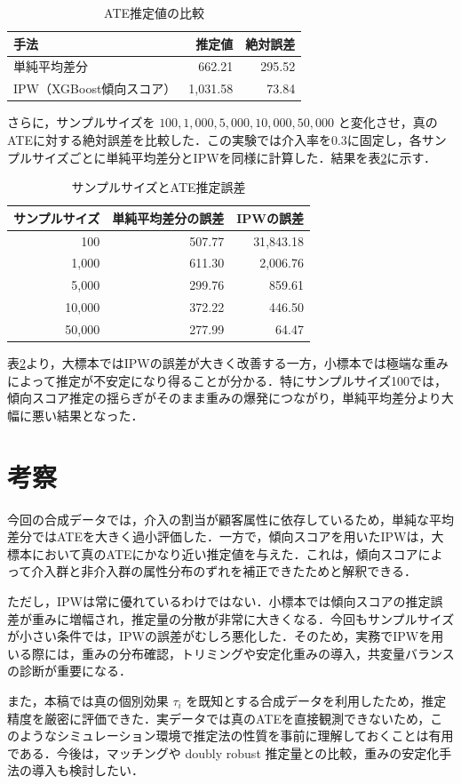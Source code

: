 \documentclass{article}
\begin{document}
\begin{table}[ht]
\centering
\caption{ATE推定値の比較}
\label{tab:ate_compare}
\begin{tabular}{lrr}
\hline
手法 & 推定値 & 絶対誤差 \\
\hline
単純平均差分 & 662.21 & 295.52 \\
IPW（XGBoost傾向スコア） & 1{,}031.58 & 73.84 \\
\hline
\end{tabular}
\end{table}

さらに，サンプルサイズを $100, 1{,}000, 5{,}000, 10{,}000, 50{,}000$ と変化させ，真のATEに対する絶対誤差を比較した．この実験では介入率を0.3に固定し，各サンプルサイズごとに単純平均差分とIPWを同様に計算した．結果を表\ref{tab:samplesize}に示す．

\begin{table}[ht]
\centering
\caption{サンプルサイズとATE推定誤差}
\label{tab:samplesize}
\begin{tabular}{rrr}
\hline
サンプルサイズ & 単純平均差分の誤差 & IPWの誤差 \\
\hline
100 & 507.77 & 31{,}843.18 \\
1{,}000 & 611.30 & 2{,}006.76 \\
5{,}000 & 299.76 & 859.61 \\
10{,}000 & 372.22 & 446.50 \\
50{,}000 & 277.99 & 64.47 \\
\hline
\end{tabular}
\end{table}

表\ref{tab:samplesize}より，大標本ではIPWの誤差が大きく改善する一方，小標本では極端な重みによって推定が不安定になり得ることが分かる．特にサンプルサイズ100では，傾向スコア推定の揺らぎがそのまま重みの爆発につながり，単純平均差分より大幅に悪い結果となった．

\section{考察}
今回の合成データでは，介入の割当が顧客属性に依存しているため，単純な平均差分ではATEを大きく過小評価した．一方で，傾向スコアを用いたIPWは，大標本において真のATEにかなり近い推定値を与えた．これは，傾向スコアによって介入群と非介入群の属性分布のずれを補正できたためと解釈できる．

ただし，IPWは常に優れているわけではない．小標本では傾向スコアの推定誤差が重みに増幅され，推定量の分散が非常に大きくなる．今回もサンプルサイズが小さい条件では，IPWの誤差がむしろ悪化した．そのため，実務でIPWを用いる際には，重みの分布確認，トリミングや安定化重みの導入，共変量バランスの診断が重要になる．

また，本稿では真の個別効果 $\tau_i$ を既知とする合成データを利用したため，推定精度を厳密に評価できた．実データでは真のATEを直接観測できないため，このようなシミュレーション環境で推定法の性質を事前に理解しておくことは有用である．今後は，マッチングや doubly robust 推定量との比較，重みの安定化手法の導入も検討したい．

\printbibliography[title={参考文献}]
\end{document}
